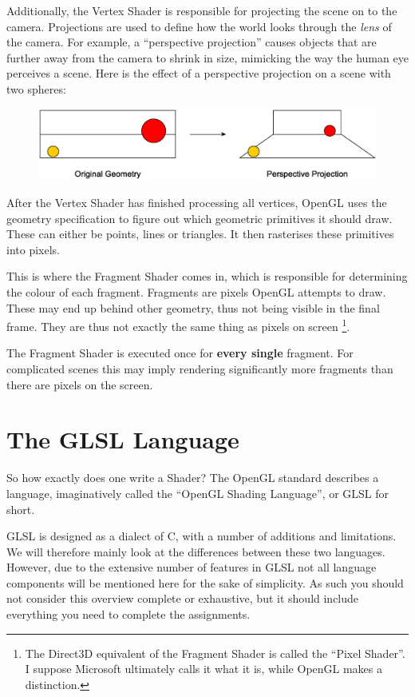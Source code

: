 Additionally, the Vertex Shader is responsible for projecting the scene on to the camera. Projections are used to define how the world looks through the \emph{lens} of the camera. For example, a ``perspective projection'' causes objects that are further away from the camera to shrink in size, mimicking the way the human eye perceives a scene. Here is the effect of a perspective projection on a scene with two spheres:

\begin{figure}[htbp]
  \centering
  \includegraphics[scale=0.45]{images/openGL_perspective_projection.eps}
\end{figure}

After the Vertex Shader has finished processing all vertices, OpenGL uses the geometry specification to figure out which geometric primitives it should draw. These can either be points, lines or triangles. It then rasterises these primitives into pixels.

This is where the Fragment Shader comes in, which is responsible for determining the colour of each fragment. Fragments are pixels OpenGL attempts to draw. These may end up behind other geometry, thus not being visible in the final frame. They are thus not exactly the same thing as pixels on screen \footnote{The Direct3D equivalent of the Fragment Shader is called the ``Pixel Shader''. I suppose Microsoft ultimately calls it what it is, while OpenGL makes a distinction.}.

The Fragment Shader is executed once for {\bf every single} fragment. For complicated scenes this may imply rendering significantly more fragments than there are pixels on the screen.

\section{The GLSL Language}

So how exactly does one write a Shader? The OpenGL standard describes a language, imaginatively called the ``OpenGL Shading Language'', or GLSL for short.

GLSL is designed as a dialect of C, with a number of additions and limitations. We will therefore mainly look at the differences between these two languages. However, due to the extensive number of features in GLSL not all language components will be mentioned here for the sake of simplicity. As such you should not consider this overview complete or exhaustive, but it should include everything you need to complete the assignments.

